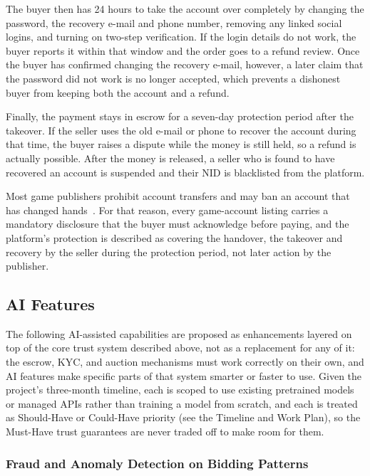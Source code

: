 \documentclass[11pt,a4paper]{article}
\begin{document}
The buyer then has 24 hours to take the account over completely by changing the password, the recovery
e-mail and phone number, removing any linked social logins, and turning on two-step verification. If
the login details do not work, the buyer reports it within that window and the order goes to a refund
review. Once the buyer has confirmed changing the recovery e-mail, however, a later claim that the
password did not work is no longer accepted, which prevents a dishonest buyer from keeping both the
account and a refund.

Finally, the payment stays in escrow for a seven-day protection period after the takeover. If the
seller uses the old e-mail or phone to recover the account during that time, the buyer raises a dispute
while the money is still held, so a refund is actually possible. After the money is released, a seller
who is found to have recovered an account is suspended and their NID is blacklisted from the platform.

Most game publishers prohibit account transfers and may ban an account that has changed
hands~\cite[\S5.2]{supp}. For that reason, every game-account listing carries a mandatory disclosure
that the buyer must acknowledge before paying, and the platform's protection is described as covering
the handover, the takeover and recovery by the seller during the protection period, not later action by
the publisher.

\subsection{AI Features}

The following AI-assisted capabilities are proposed as enhancements layered on top of the core trust
system described above, not as a replacement for any of it: the escrow, KYC, and auction mechanisms
must work correctly on their own, and AI features make specific parts of that system smarter or faster
to use. Given the project's three-month timeline, each is scoped to use existing pretrained models or
managed APIs rather than training a model from scratch, and each is treated as Should-Have or Could-Have
priority (see the Timeline and Work Plan), so the Must-Have trust guarantees are never traded off to make
room for them.

\subsubsection*{Fraud and Anomaly Detection on Bidding Patterns}
\end{document}
